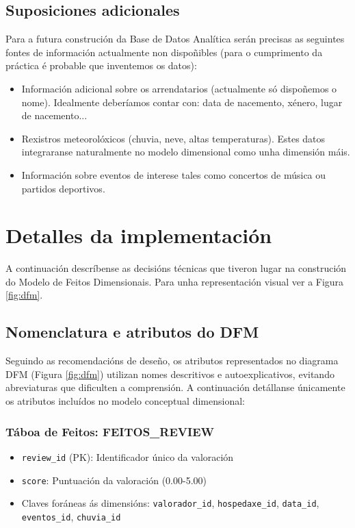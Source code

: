 \documentclass[12pt,a4paper]{article}
\begin{document}
\subsection{Suposiciones adicionales}

Para a futura construción da Base de Datos Analítica serán precisas as seguintes fontes de información actualmente non dispoñibles (para o cumprimento da práctica é probable que inventemos os datos):
\begin{itemize}
	\item Información adicional sobre os arrendatarios (actualmente só dispoñemos o nome). Idealmente deberíamos contar con: data de nacemento, xénero, lugar de nacemento...
	\item Rexistros meteorolóxicos (chuvia, neve, altas temperaturas). Estes datos integraranse naturalmente no modelo dimensional como unha dimensión máis.
	\item Información sobre eventos de interese tales como concertos de música ou partidos deportivos.
\end{itemize}

\section{Detalles da implementación}

A continuación descríbense as decisións técnicas que tiveron lugar na construción do Modelo de Feitos Dimensionais. Para unha representación visual ver a Figura \ref{fig:dfm}.

\subsection{Nomenclatura e atributos do DFM}

Seguindo as recomendacións de deseño, os atributos representados no diagrama DFM (Figura \ref{fig:dfm}) utilizan nomes descritivos e autoexplicativos, evitando abreviaturas que dificulten a comprensión. A continuación detállanse únicamente os atributos incluídos no modelo conceptual dimensional:

\subsubsection{Táboa de Feitos: FEITOS\_REVIEW}
\begin{itemize}
    \item \texttt{review\_id} (PK): Identificador único da valoración
    \item \texttt{score}: Puntuación da valoración (0.00-5.00)
    \item Claves foráneas ás dimensións: \texttt{valorador\_id}, \texttt{hospedaxe\_id}, \texttt{data\_id}, \texttt{eventos\_id}, \texttt{chuvia\_id}
\end{itemize}
\end{document}
